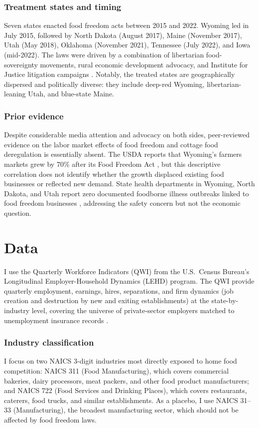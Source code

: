 \documentclass[12pt]{article}
\begin{document}
\subsubsection*{Treatment states and timing} Seven states enacted food freedom acts between 2015 and 2022. Wyoming led in July 2015, followed by North Dakota (August 2017), Maine (November 2017), Utah (May 2018), Oklahoma (November 2021), Tennessee (July 2022), and Iowa (mid-2022). The laws were driven by a combination of libertarian food-sovereignty movements, rural economic development advocacy, and Institute for Justice litigation campaigns \citep{ij2023}. Notably, the treated states are geographically dispersed and politically diverse: they include deep-red Wyoming, libertarian-leaning Utah, and blue-state Maine.

\subsubsection*{Prior evidence} Despite considerable media attention and advocacy on both sides, peer-reviewed evidence on the labor market effects of food freedom and cottage food deregulation is essentially absent. The USDA reports that Wyoming's farmers markets grew by 70\% after its Food Freedom Act \citep{usda2020}, but this descriptive correlation does not identify whether the growth displaced existing food businesses or reflected new demand. State health departments in Wyoming, North Dakota, and Utah report zero documented foodborne illness outbreaks linked to food freedom businesses \citep{neha2023}, addressing the safety concern but not the economic question.

\section{Data}
\label{sec:data}

I use the Quarterly Workforce Indicators (QWI) from the U.S.\ Census Bureau's Longitudinal Employer-Household Dynamics (LEHD) program. The QWI provide quarterly employment, earnings, hires, separations, and firm dynamics (job creation and destruction by new and exiting establishments) at the state-by-industry level, covering the universe of private-sector employers matched to unemployment insurance records \citep{abowd2009lehd}.

\subsubsection*{Industry classification} I focus on two NAICS 3-digit industries most directly exposed to home food competition: NAICS 311 (Food Manufacturing), which covers commercial bakeries, dairy processors, meat packers, and other food product manufacturers; and NAICS 722 (Food Services and Drinking Places), which covers restaurants, caterers, food trucks, and similar establishments. As a placebo, I use NAICS 31--33 (Manufacturing), the broadest manufacturing sector, which should not be affected by food freedom laws.
\end{document}
